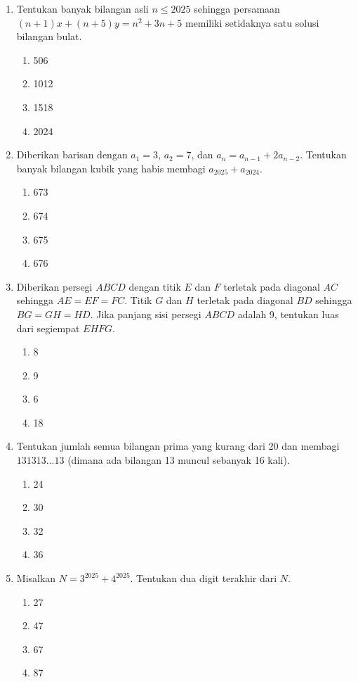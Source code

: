\documentclass[12pt]{article}
\begin{document}
\begin{enumerate}
    \item Tentukan banyak bilangan asli $n \le 2025$ sehingga persamaan $(n+1)x+(n+5)y=n^{2}+3n+5$ memiliki setidaknya satu solusi bilangan bulat.
    \begin{enumerate}
        \item 506
        \item 1012
        \item 1518
        \item 2024
    \end{enumerate}

    \item Diberikan barisan dengan $a_{1}=3$, $a_{2}=7$, dan $a_{n}=a_{n-1}+2a_{n-2}$. Tentukan banyak bilangan kubik yang habis membagi $a_{2025}+a_{2024}$.
    \begin{enumerate}
        \item 673
        \item 674
        \item 675
        \item 676
    \end{enumerate}

    \item Diberikan persegi $ABCD$ dengan titik $E$ dan $F$ terletak pada diagonal $AC$ sehingga $AE=EF=FC$. Titik $G$ dan $H$ terletak pada diagonal $BD$ sehingga $BG=GH=HD$. Jika panjang sisi persegi $ABCD$ adalah 9, tentukan luas dari segiempat $EHFG$.
    \begin{enumerate}
        \item 8
        \item 9
        \item 6
        \item 18
    \end{enumerate}

    \item Tentukan jumlah semua bilangan prima yang kurang dari 20 dan membagi $131313\dots13$ (dimana ada bilangan 13 muncul sebanyak 16 kali).
    \begin{enumerate}
        \item 24
        \item 30
        \item 32
        \item 36
    \end{enumerate}

    \item Misalkan $N=3^{2025}+4^{2025}$. Tentukan dua digit terakhir dari $N$.
    \begin{enumerate}
        \item 27
        \item 47
        \item 67
        \item 87
    \end{enumerate}


\end{enumerate}
\end{document}
